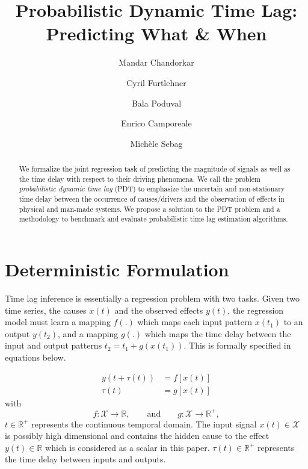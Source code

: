 \documentclass[envcountsect,runningheads]{llncs}
\theoremstyle{etoile}
\begin{document}
%
\title{Probabilistic Dynamic Time Lag: Predicting What \& When}
%
%
\author{Mandar Chandorkar \and
Cyril Furtlehner \and
Bala Poduval  \and
Enrico Camporeale \and 
Mich\`ele Sebag
}
%
%
%
\maketitle              %
%
\begin{abstract}
      We formalize the joint regression task of predicting the magnitude of signals as well as the time delay with respect to their driving phenomena. 
      We call the problem \emph{probabilistic dynamic time lag} (PDT) to emphasize the uncertain and non-stationary time delay between the occurrence of 
      causes/drivers and the observation of effects in physical and man-made systems. We propose a solution to the PDT problem and a methodology to 
      benchmark and evaluate probabilistic time lag estimation algorithms.
\end{abstract}



\section{Deterministic Formulation}\label{sec:formulation}

Time lag inference is essentially a regression problem with two tasks. 
Given two time series, the causes $x(t)$ and the observed effects $y(t)$, the regression model 
must learn a mapping $f(.)$ which maps each input pattern $x(t_1)$ to an output $y(t_2)$, and a 
mapping $g(.)$ which maps the time delay between the input and output patterns $t_2 = t_1 + g(x(t_1))$. 
This is formally specified in equations below.

\begin{align}
y(t + \tau(t)) & = f[x(t)]\label{eq:pb1}\\
\tau(t) & = g[x(t)]\label{eq:pb2} 
\end{align}
with
\[
f: \mathcal{X}  \rightarrow \mathbb{R},\qquad\text{and}\qquad
g: \mathcal{X}  \rightarrow \mathbb{R}^{+},
\]
$t \in \mathbb{R}^{+}$ represents the continuous temporal domain. The input signal 
$x(t)\in \mathcal{X}$ is possibly high dimensional and contains the hidden cause to 
the effect $y(t)\in\mathbb{R}$ which is considered as a scalar in this paper. 
$\tau(t)\in \mathbb{R}^+$ represents the time delay between inputs and outputs.
\end{document}
